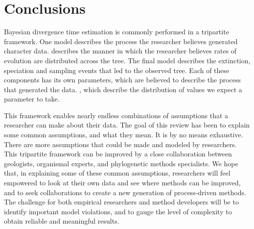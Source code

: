 
\section{Conclusions}

Bayesian divergence time estimation is commonly performed in a tripartite framework.
One model describes the process the researcher believes generated  character data.
 describes the manner in which the researcher believes rates of evolution are distributed across the tree.
The final model describes the extinction, speciation and sampling events that  led to the observed tree.
Each of these components has its own parameters, which are believed to describe the process that generated the data.
, which describe the distribution of values we expect a parameter to take.

This framework enables nearly endless combinations of assumptions that a researcher can make about their data.
The goal of this review has been to explain some common assumptions, and what they mean.
It is by no means exhaustive.
There are more assumptions that could be made and modeled by researchers.
This tripartite framework can be improved by a close collaboration between geologists, organismal experts, and phylogenetic methods specialists.
We hope that, in explaining some of these common assumptions, researchers will feel empowered to look at their own data and see where methods can be improved, and to seek collaborations to create a new generation of process-driven methods. The challenge for both empirical researchers and method developers will be to identify important model violations, and to gauge the level of complexity  to obtain reliable and meaningful results.

